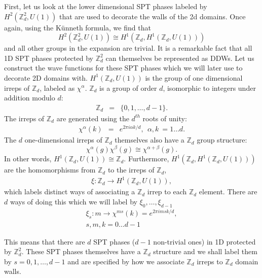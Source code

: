 \documentclass[aps,amsfonts,pra,twocolumn,showpacs]{revtex4-1}
\newcommand{\zd}{\mathbb{Z}_d}
\begin{document}
First, let us look at the lower dimensional SPT phases labeled by $H^2(\mathbb{Z}_d^2,U(1))$ that are used to decorate the walls of the 2d domains. Once again, using the K\"{u}nneth formula, we find that 
\begin{equation}
H^2(\mathbb{Z}_d^2,U(1)) \cong H^1(\mathbb{Z}_d,H^1(\mathbb{Z}_d,U(1)))
\end{equation}
and all other groups in the expansion are trivial. It is a remarkable fact that all 1D SPT phases protected by $\zd^2$ can themselves be represented as DDWs. Let us construct the wave functions for these SPT phases which we will later use to decorate 2D domains with. $H^1(\mathbb{Z}_d,U(1))$ is the group of one dimensional irreps of $\mathbb{Z}_d$, labeled as $\chi^\alpha$. $\mathbb{Z}_d$ is a group of order $d$, isomorphic to  integers under addition modulo $d$: 
\begin{eqnarray}
\mathbb{Z}_d &=& \{0,1,\ldots,{d-1}\}.
\end{eqnarray}
 The irreps of $\zd$ are generated using the $d^{th}$ roots of unity:
\begin{eqnarray}
\chi^\alpha(k) &=& e^{2 \pi i \alpha k/d},~~\alpha,k~=1\ldots d.
\end{eqnarray}
The $d$ one-dimensional irreps of $\zd$ themselves also have a $\zd$ group structure:
\begin{equation}
\chi^\alpha(g) \chi^\beta(g) \cong \chi^{\alpha+\beta}(g).
\end{equation}
In other words, $H^1(\mathbb{Z}_d,U(1)) \cong \zd$. Furthermore, $H^1(\mathbb{Z}_d,H^1(\mathbb{Z}_d,U(1)))$ are the homomorphisms from $\zd$ to the irreps of $\zd$,
\begin{eqnarray}
\xi: \zd \rightarrow H^1(\mathbb{Z}_d,U(1)),
\end{eqnarray}
which labels distinct ways of associating a $\zd$ irrep to each $\zd$ element. There are $d$ ways of doing this which we will label by $\xi_0,\ldots,\xi_{d-1}$
\begin{eqnarray}
\xi_s: m \rightarrow \chi^{ms}(k) = e^{2 \pi i m s k/d}, \nonumber\\
s,m,k=0\ldots{d-1}
\end{eqnarray}

This means that there are $d$ SPT phases ($d-1$ non-trivial ones) in 1D protected by $\zd^2$. These SPT phases themselves have a $\zd$ structure and we shall label them by $s=0,1,\ldots,d-1$ and are specified by how we associate $\zd$ irreps to $\zd$ domain walls. 
\end{document}
